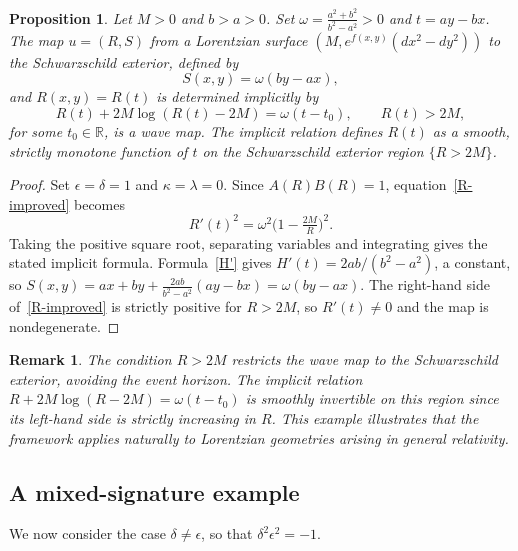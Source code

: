 \documentclass[12pt]{amsart}
\newtheorem{remark}[theorem]{Remark}
\newtheorem{proposition}[theorem]{Proposition}
\begin{document}
\begin{proposition}\label{prop:schwarz}
Let $M>0$ and $b > a > 0$. Set $\omega = \frac{a^2+b^2}{b^2-a^2} > 0$
and $t = ay - bx$. The map $u = (R,S)$ from a Lorentzian surface
$(M, e^{f(x,y)}(dx^2-dy^2))$ to the Schwarzschild exterior, defined by
\[
S(x,y) = \omega(by - ax),
\]
and $R(x,y) = R(t)$ is determined implicitly by
\[
R(t) + 2M\log(R(t)-2M) = \omega(t-t_0), \qquad R(t) > 2M,
\]
for some $t_0 \in \mathbb{R}$, is a wave map. The implicit relation
defines $R(t)$ as a smooth, strictly monotone function of $t$ on the
Schwarzschild exterior region $\{R > 2M\}$.
\end{proposition}

\begin{proof}
Set $\epsilon = \delta = 1$ and $\kappa = \lambda = 0$.
Since $A(R)B(R) = 1$,
equation~\eqref{R-improved} becomes
\[
R'(t)^2 = \omega^2\bigl(1 - \tfrac{2M}{R}\bigr)^2.
\]
Taking the positive square root, separating variables and integrating gives the stated implicit formula. Formula~\eqref{H'} gives $H'(t) = 2ab/(b^2-a^2)$,
a constant, so $S(x,y) = ax+by + \frac{2ab}{b^2-a^2}(ay-bx) =
\omega(by-ax)$. The right-hand side of~\eqref{R-improved} is
strictly positive for $R>2M$, so $R'(t)\neq 0$ and the map is
nondegenerate.
\end{proof}

\begin{remark}
The condition $R > 2M$ restricts the wave map to the Schwarzschild
exterior, avoiding the event horizon. The implicit relation
$R + 2M\log(R-2M) = \omega(t-t_0)$ is smoothly invertible on this
region since its left-hand side is strictly increasing in $R$.
This example illustrates that the framework applies naturally to
Lorentzian geometries arising in general relativity.
\end{remark}

\subsection{A mixed-signature example}

We now consider the case $\delta \neq \epsilon$, so that
$\delta^2\epsilon^2 = -1$.
\end{document}
